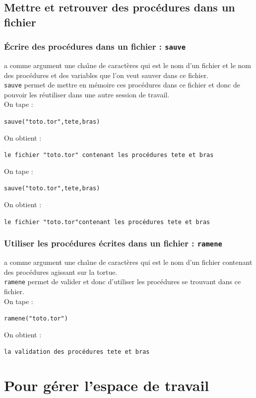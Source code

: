 \documentclass[a4paper,11pt]{book}
\begin{document}
\section{Mettre et retrouver des proc\'edures dans un fichier}
\subsection{\'Ecrire des proc\'edures dans un fichier : {\tt sauve}}
 a comme argument une cha\^{\i}ne de caract\`eres qui est 
le nom d'un fichier et le nom des proc\'edures et des variables que l'on veut 
sauver dans ce fichier.\\
{\tt sauve} permet de mettre en m\'emoire ces proc\'edures dans ce fichier
et donc de pouvoir les r\'eutiliser dans une autre session de travail.\\
On tape :
\begin{center}{\tt sauve("toto.tor",tete,bras)}\end{center}
On obtient :
\begin{center}{\tt le fichier "toto.tor" contenant les proc\'edures tete et bras}\end{center}
On tape :
\begin{center}{\tt sauve("toto.tor",tete,bras)}\end{center}
On obtient :
\begin{center}{\tt le fichier "toto.tor"contenant les proc\'edures tete et bras}\end{center}

\subsection{Utiliser les proc\'edures \'ecrites dans un fichier : {\tt ramene}}
 a comme argument une cha\^{\i}ne de caract\`eres qui 
est le nom d'un fichier contenant des proc\'edures agissant sur la tortue.\\
{\tt ramene} permet de valider et donc d'utiliser les proc\'edures 
se trouvant dans ce fichier.\\
On tape :
\begin{center}{\tt ramene("toto.tor")}\end{center}
On obtient :
\begin{center}{\tt la validation des proc\'edures tete et bras}\end{center}


\chapter{Pour g\'erer l'espace de travail}
\end{document}
